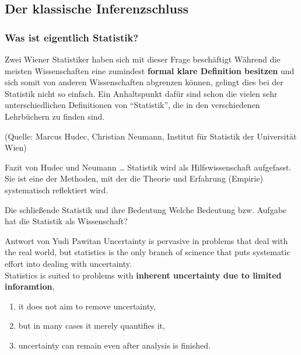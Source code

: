 \documentclass[usenames,dvipsnames,handout]{beamer}
\begin{document}
\subsection{Der klassische Inferenzschluss}
\begin{frame}
 \frametitle{Was ist eigentlich Statistik?}
 \begin{block}{Zwei Wiener Statistiker haben sich mit dieser Frage beschäftigt}
  Während  die  meisten  Wissenschaften  eine  zumindest  \textbf{formal  klare  
Definition besitzen} und sich somit von 
anderen Wissenschaften abgrenzen können, 
gelingt dies bei der Statistik nicht so einfach. 
Ein Anhaltspunkt dafür sind schon die 
vielen sehr unterschiedlichen Definitionen 
von ``Statistik'', die in den verschiedenen 
Lehrbüchern  zu  finden  sind. 
 \end{block}
 (Quelle: Marcus Hudec, Christian Neumann, Institut für Statistik der Universität Wien)
\begin{block}{Fazit von Hudec und Neumann \dots}
  Statistik wird  als Hilfswissenschaft aufgefasst. Sie ist eine der
  Methoden, mit der die Theorie und Erfahrung (Empirie) systematisch
  reflektiert wird.
  \end{block}
\end{frame}
\begin{frame}{Die schließende Statistik und ihre Bedeutung}
Welche Bedeutung bzw. Aufgabe hat die Statistik als Wissenschaft? 
\begin{block}{Antwort von Yudi Pawitan}
Uncertainty is pervasive in problems that deal with the real world, but statistics is the only branch of scinence that puts systematic effort into dealing with uncertainty.\\
Statistics is suited to problems with \textbf{inherent uncertainty due to limited inforamtion}, 
\begin{enumerate}
\item{it does not aim to remove uncertainty,}
\item{ but in many cases it merely quantifies it,}
\item{uncertainty can remain even after
analysis is finished.}
\end{enumerate}
 \end{block}
\end{frame}
\end{document}
